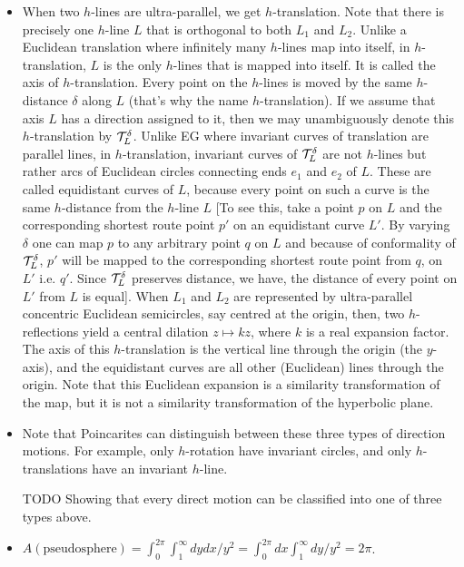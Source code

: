 \documentclass[12pt]{article}
\def\mc{\ensuremath\mathcal}
\begin{document}
\begin{itemize}
    \item When two $h$-lines are ultra-parallel, we get $h$-translation. Note that there is precisely one $h$-line $L$ that is orthogonal to both $L_1$ and $L_2$. Unlike a Euclidean translation where infinitely many $h$-lines map into itself, in $h$-translation, $L$ is the only $h$-lines that is mapped into itself. It is called the axis of $h$-translation. Every point on the $h$-lines is moved by the same $h$-distance $\delta$ along $L$ (that's why the name $h$-translation). If we assume that axis $L$ has a direction assigned to it, then we may unambiguously denote this $h$-translation by $\mc{T}_{L}^{\delta}$. Unlike EG where invariant curves of translation are parallel lines, in $h$-translation, invariant curves of $\mc{T}_{L}^{\delta}$ are not $h$-lines but rather arcs of Euclidean circles connecting ends $e_1$ and $e_2$ of $L$. These are called equidistant curves of $L$, because every point on such a curve is the same $h$-distance from the $h$-line $L$ [To see this, take a point $p$ on $L$ and the corresponding shortest route point $p'$ on an equidistant curve $L'$. By varying $\delta$ one can map $p$ to any arbitrary point $q$ on $L$ and because of conformality of $\mc{T}_{L}^{\delta}$, $p'$ will be mapped to the corresponding shortest route point from $q$, on $L'$ i.e. $q'$. Since $\mc{T}_{L}^{\delta}$ preserves distance, we have, the distance of every point on $L'$ from $L$ is equal]. When $L_1$ and $L_2$ are represented by ultra-parallel concentric Euclidean semicircles, say centred at the origin, then, two $h$-reflections yield a central dilation $z\mapsto kz$, where $k$ is a real expansion factor. The axis of this $h$-translation is the vertical line through the origin (the $y$-axis), and the equidistant curves are all other (Euclidean) lines through the origin. Note that this Euclidean expansion is a similarity transformation of the map, but it is not a similarity transformation of the hyperbolic plane.

    \item Note that Poincarites can distinguish between these three types of direction motions. For example, only $h$-rotation have invariant circles, and only $h$-translations have an invariant $h$-line.

    \item [TODO] Showing that every direct motion can be classified into one of three types above.

    \item $A(\text{pseudosphere}) = \int_{0}^{2\pi}\int_{1}^{\infty}dydx/y^2 = \int_{0}^{2\pi}dx\int_{1}^{\infty}dy/y^2 = 2\pi$.


\end{itemize}
\end{document}
